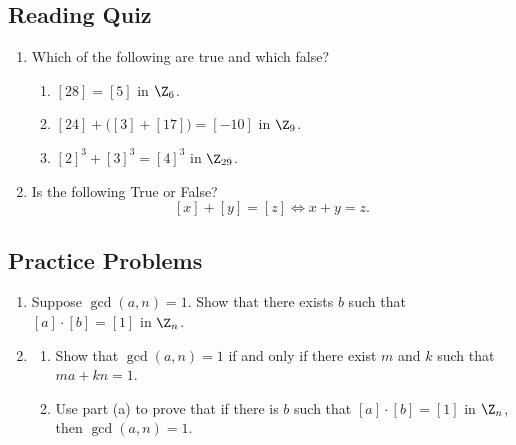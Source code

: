 

\subsection*{Reading Quiz}

\begin{enumerate}
\item Which of the following are true and which false?
  \begin{enumerate}
    \item $[28]=[5]$ in $\Z_6$.
    \item $[24]+\big([3]+[17]\big)=[-10]$ in $\Z_9$.
    \item $[2]^3+[3]^3=[4]^3$ in $\Z_{29}$.
	\end{enumerate}
	
\item Is the following True or False?
	\[[x]+[y]=[z]\iff x+y=z.\]
\end{enumerate}

\subsection*{Practice Problems}

\begin{enumerate}\renewcommand{\labelenumi}{\thesubsection.\theenumi}
\item Suppose $\gcd(a,n) = 1$. Show that there exists $b$ such that $[a] \cdot [b] = [1]$ in $\Z_n$. 

\item  \begin{enumerate}
    \item Show that $\gcd(a,n) = 1$ if and only if there exist $m$ and $k$ such that $ma + kn = 1$. 
    
    \item Use part (a) to prove that if there is $b$ such that $[a] \cdot [b] = [1]$ in $\Z_n$, then $\gcd(a,n) = 1$.
\end{enumerate}
\end{enumerate}

